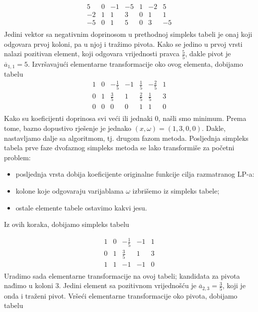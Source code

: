 \documentclass[a4paper, utf8, 11pt, colorlinks]{book}
\begin{document}
$$ \begin{array}{cccccc|c}
 	 5 & 0 & -1 & -5 & 1 & -2 & 5 \\
	-2&1  & 1 & 3 & 0 & 1 & 1 \\ \hline
	 -5 & 0 & 1 & 5 & 0 & 3 & -5 \\
 \end{array}
 $$
 Jedini vektor sa negativnim doprinosom u prethodnoj simpleks tabeli je 
 onaj koji odgovara prvoj koloni, pa u njoj i tražimo pivota.  
 Kako se jedino u prvoj vrsti nalazi pozitivan element, koji odgovara vrijednosti pravca $\frac{5}{5}$, dakle pivot je $\overline{a}_{1,1}=5$. Izvršavajući elementarne transformacije oko ovog elementa, dobijamo tabelu 
 $$ \begin{array}{cccccc|c}
        1 & 0 & -\frac{1}{5}  & -1   &  \frac{1}{5}     & -\frac{2}{5}  & 1                    \\
        0 & 1 & \frac{3}{5}   &  1   &   \frac{2}{5}  & \frac{1}{5}      & 3                   \\ \hline
        0 & 0 & 0            &  0   &   1        & 1                     & 0                                 \\
    \end{array}
$$
Kako su koeficijenti doprinosa svi veći ili jednaki 0, našli smo minimum. 
Prema tome, bazno dopustivo rješenje je jednako $(x, \omega)= (1,3, 0, 0)$. Dakle, nastavljamo dalje sa algoritmom, tj. drugom fazom metoda.  Posljednja simpleks tabela prve faze dvofaznog simpleks metoda se lako transformiše za početni problem: 
\begin{itemize}
	\item posljednja vrsta dobija koeficijente originalne funkcije cilja razmatranog LP-a:
	\item kolone koje odgovaraju varijablama $\omega$ izbrišemo iz simpleks tabele;
	\item ostale elemente tabele ostavimo kakvi jesu.
\end{itemize}
Iz ovih koraka, dobijamo simpleks tabelu 

 $$ \begin{array}{cccc|c}
 	   1 & 0 & -\frac{1}{5}     & -1   & 1 \\
 	   0 & 1 & \frac{3}{5}      & 1    & 3 \\ \hline
       1 & 1 & -1               & -1   & 0 \\
    \end{array}
$$
Uradimo sada elementarne transformacije na ovoj tabeli; kandidata za pivota nađimo u 
koloni 3. Jedini element sa pozitivnom vrijednošću je $\overline{a}_{2,3} = \frac{3}{5}$, koji je onda i traženi pivot. 
Vršeći elementarne transformacije oko pivota, dobijamo tabelu 
\end{document}
